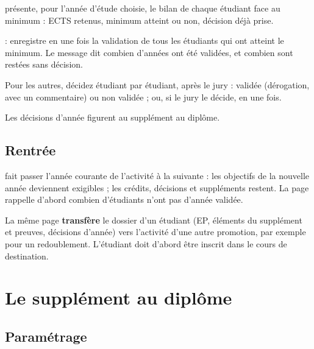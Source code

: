 \documentclass[11pt,a4paper]{article}
\begin{document}
 présente, pour l'année d'étude choisie, le
bilan de chaque étudiant face au minimum : ECTS retenus, minimum atteint ou non, décision déjà
prise.


\begin{etapes}
  \item {} : enregistre en une fois la validation de tous
    les étudiants qui ont atteint le minimum. Le message dit combien d'années ont été
    validées, et combien sont restées sans décision.
  \item Pour les autres, décidez étudiant par étudiant, après le jury : validée (dérogation,
    avec un commentaire) ou non validée ; ou, si le jury le décide,  en une fois.
\end{etapes}

Les décisions d'année figurent au supplément au diplôme.

\subsection{Rentrée}

 fait passer l'année courante de l'activité à la suivante :
les objectifs de la nouvelle année deviennent exigibles ; les crédits, décisions et suppléments
restent. La page rappelle d'abord combien d'étudiants n'ont pas d'année validée.

La même page \textbf{transfère} le dossier d'un étudiant (EP, éléments du supplément et
preuves, décisions d'année) vers l'activité d'une autre promotion, par exemple pour un
redoublement. L'étudiant doit d'abord être inscrit dans le cours de destination.


\section{Le supplément au diplôme}\label{sec:supplement}

\subsection{Paramétrage}\label{sec:supplement-reglages}
\end{document}
